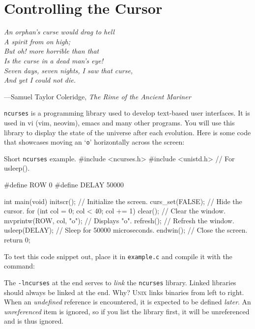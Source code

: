 \section{Controlling the Cursor}

\textwidth
\epigraph{\emph{An orphan's curse would drag to hell \\ A spirit from on high;
\\ But oh! more horrible than that \\ Is the curse in a dead man's eye! \\ Seven
days, seven nights, I saw that curse, \\ And yet I could not die.}}{---Samuel
Taylor Coleridge, \emph{The Rime of the Ancient Mariner}}

\texttt{ncurses} is a programming library used to develop text-based user
interfaces. It is used in vi (vim, neovim), emacs and many other programs. You
will use this library to display the state of the universe after each evolution.
Here is some code that showcases moving an `\texttt{o}' horizontally across the
screen:

\begin{clisting}{Short \texttt{ncurses} example.}
#include <ncurses.h>
#include <unistd.h> // For usleep().

#define ROW 0
#define DELAY 50000

int main(void) {
    initscr();                    // Initialize the screen.
    curs_set(FALSE);              // Hide the cursor.
    for (int col = 0; col < 40; col += 1) {
        clear();                  // Clear the window.
        mvprintw(ROW, col, "o");  // Displays "o".
        refresh();                // Refresh the window.
        usleep(DELAY);            // Sleep for 50000 microseconds.
    }
    endwin();                     // Close the screen.
    return 0;
}
\end{clisting}

To test this code snippet out, place it in \texttt{example.c} and compile it
with the command:


The \texttt{-lncurses} at the end serves to \emph{link} the \texttt{ncurses}
library. Linked libraries should always be linked at the end. Why? \textsc{Unix}
links binaries from left to right. When an \emph{undefined} reference is
encountered, it is expected to be defined \emph{later}. An \emph{unreferenced}
item is ignored, so if you list the library first, it will be unreferenced and
is thus ignored.
